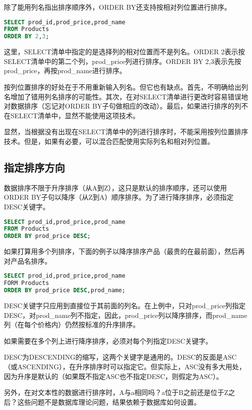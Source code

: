 除了能用列名指出排序顺序外，ORDER BY还支持按相对列位置进行排序。

\begin{lstlisting}[language=SQL]
SELECT prod_id,prod_price,prod_name
FROM Products
ORDER BY 2,3;
\end{lstlisting}

这里，SELECT清单中指定的是选择列的相对位置而不是列名。ORDER 2表示按SELECT清单中的第二个列，prod\_price列进行排序。ORDER BY 2,3表示先按prod\_price，再按prod\_name进行排序。

按列位置排序的好处在于不用重新输入列名。但它也有缺点。首先，不明确给出列名增加了错用列名排序的可能性。其次，在对SELECT清单进行更改时容易错误地对数据排序（忘记对ORDER BY子句做相应的改动）。最后，如果进行排序的列不在SELECT清单中，显然不能使用这项技术。

显然，当根据没有出现在SELECT清单中的列进行排序时，不能采用按列位置排序技术。但是，如果有必要，可以混合匹配使用实际列名和相对列位置。
\subsection{指定排序方向}

数据排序不限于升序排序（从A到Z），这只是默认的排序顺序，还可以使用ORDER BY子句以降序（从Z到A）顺序排序。为了进行降序排序，必须指定DESC关键字。

\begin{lstlisting}[language=SQL]
SELECT prod_id,prod_price,prod_name
FROM Products
ORDER BY prod_price DESC;
\end{lstlisting}

如果打算用多个列排序，下面的例子以降序排序产品（最贵的在最前面），然后再对产品名排序。

\begin{lstlisting}[language=SQL]
SELECT prod_id,prod_price,prod_name
FORM Products
ORDER BY prod_price DESC,prod_name;
\end{lstlisting}

DESC关键字只应用到直接位于其前面的列名。在上例中，只对prod\_price列指定DESC，对prod\_name列不指定，因此，prod\_price列以降序排序，而prod\_name列（在每个价格内）仍然按标准的升序排序。

如果需要在多个列上进行降序排序，必须对每个列指定DESC关键字。

DESC为DESCENDING的缩写，这两个关键字是通用的。DESC的反面是ASC（或ASCENDING），在升序排序时可以指定它。但实际上，ASC没有多大用处，因为升序是默认的（如果既不指定ASC也不指定DESC，则假定为ASC）。

另外，在对文本性的数据进行排序时，A与a相同吗？a位于B之前还是位于Z之后？这些问题不是数据库理论问题，结果依赖于数据库如何设置。

